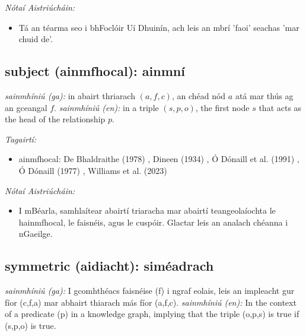 \documentclass{article}
\begin{document}
 \noindent \textit{Nótaí Aistriúcháin:}
\begin{itemize}
	\item Tá an téarma seo i bhFoclóir Uí Dhuinín, ach leis an mbrí 'faoi' seachas 'mar chuid de'.
\end{itemize}


\subsection*{subject (ainmfhocal): ainmní} 
 \noindent \textit{sainmhíniú (ga):} in abairt thriarach $(a,f,c)$, an chéad nód $a$ atá mar thús ag an gceangal $f$.
\newline\newline
 \noindent \textit{sainmhíniú (en):} in a triple $(s,p,o)$, the first node $s$ that acts as the head of the relationship $p$.
\newline

 \noindent \textit{Tagairtí:}
\begin{itemize}
	\item ainmfhocal: De Bhaldraithe (1978) \cite{de-bhaldraithe}, Dineen (1934) \cite{dineen}, Ó Dónaill et al. (1991) \cite{focloir-beag}, Ó Dónaill (1977) \cite{odonaill}, Williams et al. (2023) \cite{storchiste}
\end{itemize}

 \noindent \textit{Nótaí Aistriúcháin:}
\begin{itemize}
	\item I mBéarla, samhlaítear abairtí triaracha mar abairtí teangeolaíochta le hainmfhocal, le faisnéis, agus le cuspóir. Glactar leis an analach chéanna i nGaeilge.
\end{itemize}


\subsection*{symmetric (aidiacht): siméadrach} 
 \noindent \textit{sainmhíniú (ga):} I gcomhthéacs faisnéise (f) i ngraf eolais, leis an impleacht gur fíor (c,f,a) mar abhairt thiarach más fíor (a,f,c).
\newline\newline
 \noindent \textit{sainmhíniú (en):} In the context of a predicate (p) in a knowledge graph, implying that the triple (o,p,s) is true if (s,p,o) is true.
\newline
\end{document}
